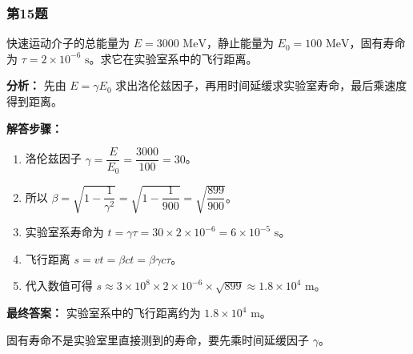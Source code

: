 \documentclass[12pt,a4paper]{ctexart}
\begin{document}
\subsubsection*{第15题}
\begin{tcolorbox}[colback=gray!2!white,colframe=black!60,title={题目}]
快速运动介子的总能量为 \(E=3000\text{ MeV}\)，静止能量为 \(E_0=100\text{ MeV}\)，固有寿命为 \(\tau=2\times 10^{-6}\text{ s}\)。求它在实验室系中的飞行距离。\par
\end{tcolorbox}
\begin{tcolorbox}[colback=blue!2!white,colframe=blue!55!black,title={完整答案}]
\textbf{分析：}
先由 \(E=\gamma E_0\) 求出洛伦兹因子，再用时间延缓求实验室寿命，最后乘速度得到距离。\par
\textbf{解答步骤：}
\begin{enumerate}
\item 洛伦兹因子 \(\gamma=\dfrac{E}{E_0}=\dfrac{3000}{100}=30\)。
\item 所以 \(\beta=\sqrt{1-\dfrac1{\gamma^2}}=\sqrt{1-\dfrac1{900}}=\sqrt{\dfrac{899}{900}}\)。
\item 实验室系寿命为 \(t=\gamma\tau=30\times 2\times 10^{-6}=6\times 10^{-5}\text{ s}\)。
\item 飞行距离 \(s=vt=\beta ct=\beta\gamma c\tau\)。
\item 代入数值可得 \(s\approx 3\times 10^8\times 2\times 10^{-6}\times \sqrt{899}\approx 1.8\times 10^4\text{ m}\)。
\end{enumerate}
\textbf{最终答案：}
实验室系中的飞行距离约为 \(1.8\times 10^4\text{ m}\)。\par
\end{tcolorbox}
\begin{tcolorbox}[colback=red!2!white,colframe=red!55!black,title={易错点}]
固有寿命不是实验室里直接测到的寿命，要先乘时间延缓因子 \(\gamma\)。\par
\end{tcolorbox}
\end{document}
